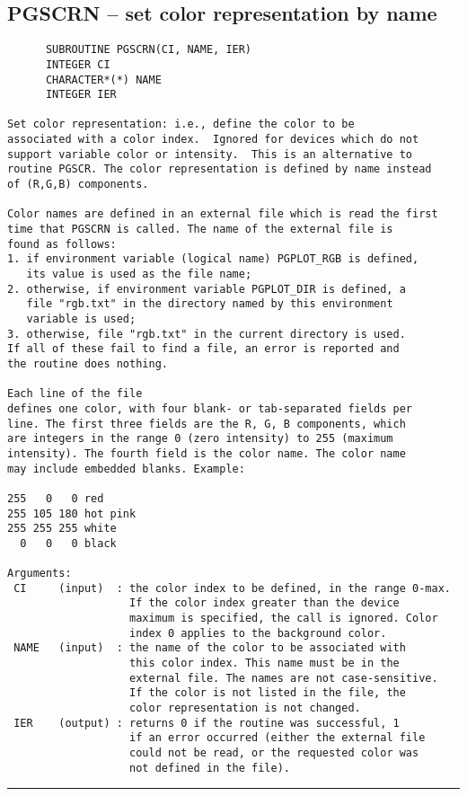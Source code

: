 {\subsection*{PGSCRN -- set color representation by name }
\begin{verbatim}
      SUBROUTINE PGSCRN(CI, NAME, IER)
      INTEGER CI
      CHARACTER*(*) NAME
      INTEGER IER

Set color representation: i.e., define the color to be
associated with a color index.  Ignored for devices which do not
support variable color or intensity.  This is an alternative to
routine PGSCR. The color representation is defined by name instead
of (R,G,B) components.

Color names are defined in an external file which is read the first
time that PGSCRN is called. The name of the external file is
found as follows:
1. if environment variable (logical name) PGPLOT_RGB is defined,
   its value is used as the file name;
2. otherwise, if environment variable PGPLOT_DIR is defined, a
   file "rgb.txt" in the directory named by this environment
   variable is used;
3. otherwise, file "rgb.txt" in the current directory is used.
If all of these fail to find a file, an error is reported and
the routine does nothing.

Each line of the file
defines one color, with four blank- or tab-separated fields per
line. The first three fields are the R, G, B components, which
are integers in the range 0 (zero intensity) to 255 (maximum
intensity). The fourth field is the color name. The color name
may include embedded blanks. Example:

255   0   0 red
255 105 180 hot pink
255 255 255 white
  0   0   0 black

Arguments:
 CI     (input)  : the color index to be defined, in the range 0-max.
                   If the color index greater than the device
                   maximum is specified, the call is ignored. Color
                   index 0 applies to the background color.
 NAME   (input)  : the name of the color to be associated with
                   this color index. This name must be in the
                   external file. The names are not case-sensitive.
                   If the color is not listed in the file, the
                   color representation is not changed.
 IER    (output) : returns 0 if the routine was successful, 1
                   if an error occurred (either the external file
                   could not be read, or the requested color was
                   not defined in the file).
\end{verbatim}
\hrule


}
